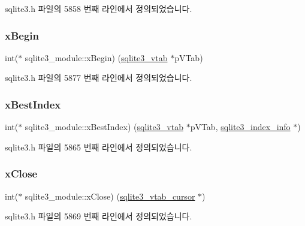 sqlite3.\+h 파일의 5858 번째 라인에서 정의되었습니다.

\mbox{\label{structsqlite3__module_af190bd5cbd1e3ff30a09ca7b015af1a1}} 
\subsubsection{\texorpdfstring{x\+Begin}{xBegin}}
{\footnotesize\ttfamily int($\ast$ sqlite3\+\_\+module\+::x\+Begin) (\hyperlink{structsqlite3__vtab}{sqlite3\+\_\+vtab} $\ast$p\+V\+Tab)}



sqlite3.\+h 파일의 5877 번째 라인에서 정의되었습니다.

\mbox{\label{structsqlite3__module_aad92b2cd56253baaeac656d7693ce4af}} 
\subsubsection{\texorpdfstring{x\+Best\+Index}{xBestIndex}}
{\footnotesize\ttfamily int($\ast$ sqlite3\+\_\+module\+::x\+Best\+Index) (\hyperlink{structsqlite3__vtab}{sqlite3\+\_\+vtab} $\ast$p\+V\+Tab, \hyperlink{structsqlite3__index__info}{sqlite3\+\_\+index\+\_\+info} $\ast$)}



sqlite3.\+h 파일의 5865 번째 라인에서 정의되었습니다.

\mbox{\label{structsqlite3__module_acc6c4d6d41f3d056e297eea9725b887c}} 
\subsubsection{\texorpdfstring{x\+Close}{xClose}}
{\footnotesize\ttfamily int($\ast$ sqlite3\+\_\+module\+::x\+Close) (\hyperlink{structsqlite3__vtab__cursor}{sqlite3\+\_\+vtab\+\_\+cursor} $\ast$)}



sqlite3.\+h 파일의 5869 번째 라인에서 정의되었습니다.

